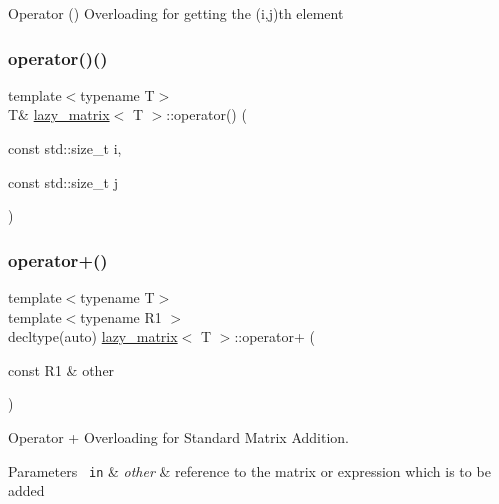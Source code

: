 Operator () Overloading for getting the (i,j)th element \mbox{\label{classlazy__matrix_ad87bc3cf498acf5480fc0a539c5d3a0a}} 
\subsubsection{\texorpdfstring{operator()()}{operator()()}\hspace{0.1cm}{\footnotesize\ttfamily [2/2]}}
{\footnotesize\ttfamily template$<$typename T$>$ \\
T\& \mbox{\hyperlink{classlazy__matrix}{lazy\+\_\+matrix}}$<$ T $>$\+::operator() (\begin{DoxyParamCaption}\item[{const std\+::size\+\_\+t}]{i,  }\item[{const std\+::size\+\_\+t}]{j }\end{DoxyParamCaption})\hspace{0.3cm}{\ttfamily [inline]}}

\mbox{\label{classlazy__matrix_a591fc5b952ef341dcb3a20051fd7aa96}} 
\subsubsection{\texorpdfstring{operator+()}{operator+()}}
{\footnotesize\ttfamily template$<$typename T$>$ \\
template$<$typename R1 $>$ \\
decltype(auto) \mbox{\hyperlink{classlazy__matrix}{lazy\+\_\+matrix}}$<$ T $>$\+::operator+ (\begin{DoxyParamCaption}\item[{const R1 \&}]{other }\end{DoxyParamCaption})\hspace{0.3cm}{\ttfamily [inline]}}



Operator + Overloading for Standard Matrix Addition. 


\begin{DoxyParams}[1]{Parameters}
\mbox{\texttt{ in}}  & {\em other} & reference to the matrix or expression which is to be added\\
\hline
\end{DoxyParams}

